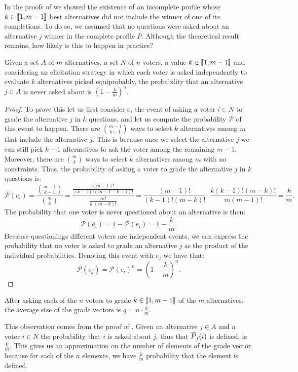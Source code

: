 	In the proofs of  we showed the existence of an incomplete profile whose $k \in \llbracket1,m-1\rrbracket$ best alternatives did not include the winner of one of its completions. To do so, we assumed that no questions were asked about an alternative $j$ winner in the complete profile $P$. Although the theoretical result remains, how likely is this to happen in practice?
	
	\begin{proposition}
		\label{pr:probabilityJ}
		Given a set $A$ of $m$ alternatives, a set $N$ of $n$ voters, a value $k\in\llbracket1,m-1\rrbracket$ and considering an elicitation strategy in which each voter is asked independently to evaluate $k$ alternatives picked equiprobably, the probability that an alternative $j\in A$ is never asked about is $(1-\frac{k}{m})^n$.
	\end{proposition}
	\begin{proof}
		To prove this let us first consider $e_i$ the event of asking a voter $i\in N$ to grade the alternative $j$ in $k$ questions, and let us compute the probability $\mathcal{P}$ of this event to happen.
		There are $\binom{m-1}{k-1}$ ways to select $k$ alternatives among $m$ that include the alternative $j$. This is because once we select the alternative $j$ we can still pick $k-1$ alternatives to ask the voter among the remaining $m-1$.
		Moreover, there are $\binom{m}{k}$ ways to select $k$ alternatives among $m$ with no constraints. Thus, the probability of asking a voter to grade the alternative $j$ in $k$ questions is:
		\[\mathcal{P}(e_i)= \frac{\binom{m-1}{k-1}}{\binom{m}{k}}=\frac{\frac{(m-1)!}{(k-1)!(m-1-k+1)!}}{\frac{m!}{k!(m-k)!}}=\frac{(m-1)!}{(k-1)!(m-k)!}\cdot\frac{k(k-1)!(m-k)!}{m(m-1)!}=\frac{k}{m}.\]
		The probability that one voter is never questioned about an alternative is then:
		\[\mathcal{P}(\overline{e_i})=1-\mathcal{P}(e_i)=1-\frac{k}{m}.\]
		Because questionings different voters are independent events, we can express the probability that no voter is asked to grade an alternative $j$ as the product of the individual probabilities. Denoting this event with $e_j$ we have that:
		\[\mathcal{P}(e_j)=\mathcal{P}(e_i)^n=\left(1-\frac{k}{m}\right)^n.\]
	\end{proof}

	\begin{remark}
		\label{rm:sizeGV}
		After asking each of the $n$ voters to grade $k\in \llbracket1,m-1\rrbracket$ of the $m$ alternatives, the average size of the grade vectors is $q = n \cdot \frac{k}{m}$.
	\end{remark}
	This observation comes from the proof of . Given an alternative $j\in A$ and a voter $i\in N$ the probability that $i$ is asked about $j$, thus that $\overline{P}_{j}(i)$ is defined, is $\frac{k}{m}$. This gives us an approximation on the number of elements of the grade vector, because for each of the $n$ elements, we have $\frac{k}{m}$ probability that the element is defined.
	
